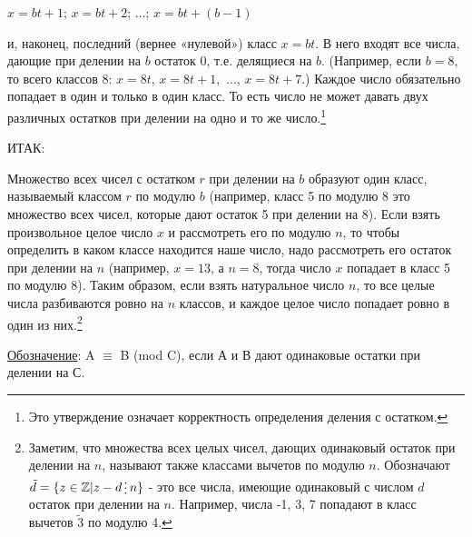 \begin{center}
    $x=bt+1$; \hspace{3mm} $x=bt+2$; \hspace{3mm} ...; \hspace{3mm} $x=bt+(b-1)$
\end{center} 

и, наконец, последний (вернее «нулевой») класс $x = bt$. В него входят все числа, дающие при делении на $b$ остаток 0, т.е. делящиеся на $b$. (Например, если $b=8$, то всего классов 8: $x = 8t$, $x = 8t + 1,$ ..., $x = 8t + 7$.) Каждое число обязательно попадает в один и только в один класс. То есть число не может давать двух различных остатков при делении на одно и то же число.\footnote{Это утверждение означает корректность определения деления с остатком.}

ИТАК:

Множество всех чисел $с$ остатком $r$ при делении на $b$ образуют один класс, называемый классом $r$ по модулю $b$ (например, класс 5 по модулю 8 это множество всех чисел, которые дают остаток 5 при делении на 8). Если взять произвольное целое число $x$ и рассмотреть его по модулю $n$, то чтобы определить в каком классе находится наше число, надо рассмотреть его остаток при делении на $n$ (например, $x = 13$, а $n = 8$, тогда число $x$ попадает в класс 5 по модулю 8). Таким образом, если взять натуральное число $n$, то все целые числа разбиваются ровно на $n$ классов, и каждое целое число попадает ровно в один из них.\footnote{Заметим, что множества всех целых чисел, дающих одинаковый остаток при делении на $n$, называют также классами вычетов по модулю $n$. Обозначают $ \tilde{d} = \{ z \in \mathbb{Z} | z - d \del n\}$ - это все числа, имеющие одинаковый с числом $d$ остаток при делении на $n$. Например, числа -1, 3, 7 попадают в класс вычетов $\tilde{3}$ по модулю 4.}

\underline{Обозначение}: A $\equiv$ B (mod C), если А и В дают одинаковые остатки при делении на С.

